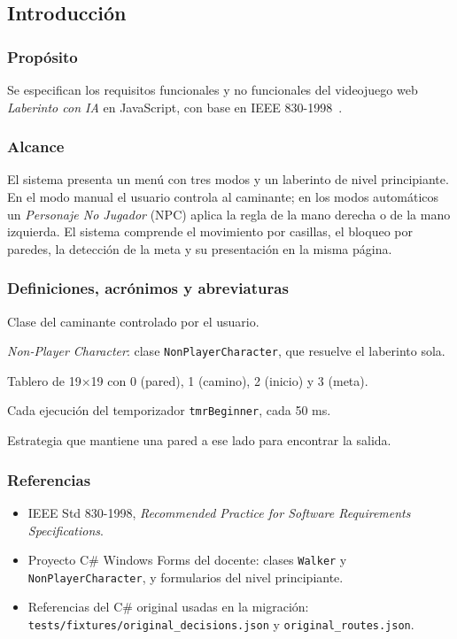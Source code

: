 \documentclass[12pt,a4paper]{article}
\begin{document}
\subsection{Introducción}

\subsubsection{Propósito}
Se especifican los requisitos funcionales y no funcionales del videojuego web
\emph{Laberinto con IA} en JavaScript, con base en IEEE 830-1998~\cite{ieee830}.

\subsubsection{Alcance}
El sistema presenta un menú con tres modos y un laberinto de nivel principiante.
En el modo manual el usuario controla al caminante; en los modos automáticos un
\emph{Personaje No Jugador} (NPC) aplica la regla de la mano derecha o de la mano
izquierda. El sistema comprende el movimiento por casillas, el bloqueo por paredes,
la detección de la meta y su presentación en la misma página.

\subsubsection{Definiciones, acrónimos y abreviaturas}
\begin{description}[leftmargin=2.8cm,style=nextline]
  \item[Walker] Clase del caminante controlado por el usuario.
  \item[NPC] \emph{Non-Player Character}: clase \texttt{NonPlayerCharacter}, que resuelve el laberinto sola.
  \item[Matriz] Tablero de 19$\times$19 con 0 (pared), 1 (camino), 2 (inicio) y 3 (meta).
  \item[Tick] Cada ejecución del temporizador \texttt{tmrBeginner}, cada 50 ms.
  \item[Mano derecha/izquierda] Estrategia que mantiene una pared a ese lado para encontrar la salida.
\end{description}

\subsubsection{Referencias}
\begin{itemize}
  \item IEEE Std 830-1998, \emph{Recommended Practice for Software Requirements Specifications}.
  \item Proyecto C\# Windows Forms del docente: clases \texttt{Walker} y \texttt{NonPlayerCharacter}, y formularios del nivel principiante.
  \item Referencias del C\# original usadas en la migración: \texttt{tests/fixtures/original\_decisions.json} y \texttt{original\_routes.json}.
\end{itemize}
\end{document}
